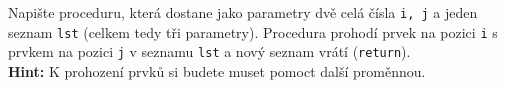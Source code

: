 \question[50]
Napište proceduru, která dostane jako parametry dvě celá čísla \texttt{i, j} a
jeden seznam \texttt{lst} (celkem tedy tři parametry). Procedura prohodí prvek
na pozici \texttt{i} s prvkem na pozici \texttt{j} v seznamu \texttt{lst} a nový
seznam vrátí (\texttt{return}).\\
\textbf{Hint:} K prohození prvků si budete muset pomoct další proměnnou.